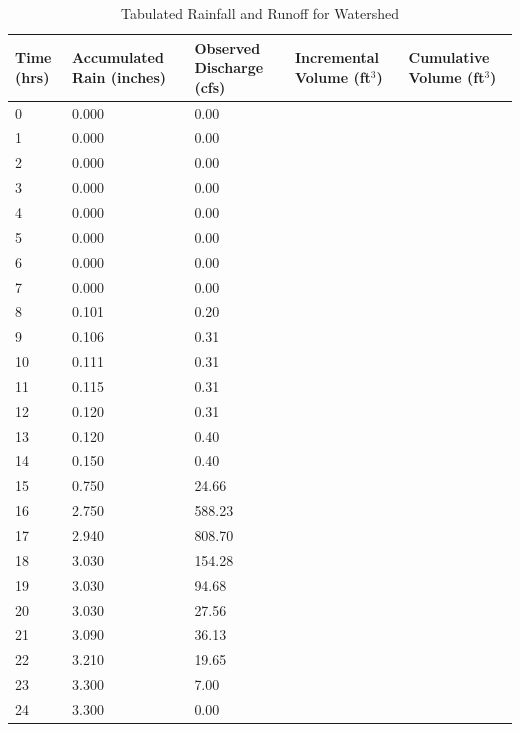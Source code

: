 \documentclass[12pt]{article}
\begin{document}
\begin{enumerate}
\begin{enumerate}[a)]
\begin{table}[h!]
\centering
\caption{Tabulated Rainfall and Runoff for Watershed}
\begin{tabular}{p{1.0in}p{1in}p{1in}p{1in}p{1in}} %
Time (hrs)&Accumulated Rain (inches)&Observed Discharge (cfs)&Incremental Volume (ft$^3$)&Cumulative Volume (ft$^3$)\\
\hline
\hline
0&0.000&0.00&~&~\\
1&0.000&0.00&~&~\\
2&0.000&0.00&~&~\\
3&0.000&0.00&~&~\\
4&0.000&0.00&~&~\\
5&0.000&0.00&~&~\\
6&0.000&0.00&~&~\\
7&0.000&0.00&~&~\\
8&0.101&0.20&~&~\\
9&0.106&0.31&~&~\\
10&0.111&0.31&~&~\\
11&0.115&0.31&~&~\\
12&0.120&0.31&~&~\\
13&0.120&0.40&~&~\\
14&0.150&0.40&~&~\\
15&0.750&24.66&~&~\\
16&2.750&588.23&~&~\\
17&2.940&808.70&~&~\\
18&3.030&154.28&~&~\\
19&3.030&94.68&~&~\\
20&3.030&27.56&~&~\\
21&3.090&36.13&~&~\\
22&3.210&19.65&~&~\\
23&3.300&7.00&~&~\\
24&3.300&0.00&~&~\\
\hline
\end{tabular}
\label{tab:raro}
\end{table}


\end{enumerate}
\end{enumerate}
\end{document}
